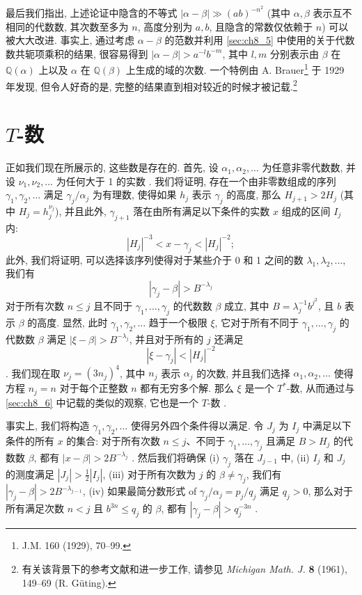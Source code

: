 最后我们指出, 上述论证中隐含的不等式 $|\alpha-\beta| \gg (ab)^{-n^2}$ (其中 $\alpha, \beta$ 表示互不相同的代数数, 其次数至多为 $n$, 高度分别为 $a, b$, 且隐含的常数仅依赖于 $n$) 可以被大大改进. 事实上, 通过考虑 $\alpha-\beta$ 的范数并利用 \autoref{sec:ch8_5} 中使用的关于代数数共轭项乘积的结果, 很容易得到 $|\alpha-\beta| > a^{-l}b^{-m}$, 其中 $l, m$ 分别表示由 $\beta$ 在 $\mathbb{Q}(\alpha)$ 上以及 $\alpha$ 在 $\mathbb{Q}(\beta)$ 上生成的域的次数. 一个特例由 A. Brauer\footnote{J.M. 160 (1929), 70--99.} 于 1929 年发现, 但令人好奇的是, 完整的结果直到相对较近的时候才被记载.\footnote{有关该背景下的参考文献和进一步工作, 请参见 \textit{Michigan Math. J.} \textbf{8} (1961), 149--69 (R. Güting).}

\section{$T$-数}\label{sec:ch8_7}

正如我们现在所展示的, 这些数是存在的. 首先, 设 $\alpha_1, \alpha_2, \dots$ 为任意非零代数数, 并设 $\nu_1, \nu_2, \dots$ 为任何大于 1 的实数 . 我们将证明, 存在一个由非零数组成的序列 $\gamma_1, \gamma_2, \dots$ 满足 $\gamma_j/\alpha_j$ 为有理数, 使得如果 $h_j$ 表示 $\gamma_j$ 的高度, 那么 $H_{j+1} > 2H_j$ (其中 $H_j = h_j^{\nu_j}$), 并且此外, $\gamma_{j+1}$ 落在由所有满足以下条件的实数 $x$ 组成的区间 $I_j$ 内:
\[|H_j|^{-3} < x - \gamma_j < |H_j|^{-2};\]
此外, 我们将证明, 可以选择该序列使得对于某些介于 0 和 1 之间的数 $\lambda_1, \lambda_2, \dots$, 我们有
\[|\gamma_j-\beta| > B^{-\lambda_j}\]
对于所有次数 $n \le j$ 且不同于 $\gamma_1, \dots, \gamma_j$ 的代数数 $\beta$ 成立, 其中 $B = \lambda_j^{-1}b^{j^2}$, 且 $b$ 表示 $\beta$ 的高度. 显然, 此时 $\gamma_1, \gamma_2, \dots$ 趋于一个极限 $\xi$, 它对于所有不同于 $\gamma_1, \dots, \gamma_j$ 的代数数 $\beta$ 满足 $|\xi-\beta| > B^{-\lambda_j}$, 并且对于所有的 $j$ 还满足
\[|\xi-\gamma_j| < |H_j|^{-2}\] . 我们现在取 $\nu_j = (3n_j)^4$, 其中 $n_j$ 表示 $\alpha_j$ 的次数, 并且我们选择 $\alpha_1, \alpha_2, \dots$ 使得方程 $n_j = n$ 对于每个正整数 $n$ 都有无穷多个解. 那么 $\xi$ 是一个 $T^*$-数, 从而通过与 \autoref{sec:ch8_6} 中记载的类似的观察, 它也是一个 $T$-数 .

事实上, 我们将构造 $\gamma_1, \gamma_2, \dots$ 使得另外四个条件得以满足. 令 $J_j$ 为 $I_j$ 中满足以下条件的所有 $x$ 的集合: 对于所有次数 $n \le j$、不同于 $\gamma_1, \dots, \gamma_j$ 且满足 $B > H_j$ 的代数数 $\beta$, 都有 $|x-\beta| > 2B^{-\lambda_j}$ . 然后我们将确保 (i) $\gamma_j$ 落在 $J_{j-1}$ 中, (ii) $I_j$ 和 $J_j$ 的测度满足 $|J_j| > \frac{1}{2}|I_j|$, (iii) 对于所有次数为 $j$ 的 $\beta \neq \gamma_j$, 我们有 $|\gamma_j-\beta| > 2B^{-\lambda_{j-1}}$, (iv) 如果最简分数形式 of $\gamma_j/\alpha_j = p_j/q_j$ 满足 $q_j > 0$, 那么对于所有满足次数 $n < j$ 且 $b^{3n} \le q_j$ 的 $\beta$, 都有 $|\gamma_j-\beta| > q_j^{-3n}$ .

